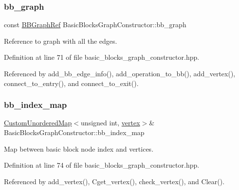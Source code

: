 \subsubsection{\texorpdfstring{bb\+\_\+graph}{bb\_graph}}
{\footnotesize\ttfamily const \hyperlink{basic__block_8hpp_a0e7f233d1b83cad0bfd5aa865f0d3532}{B\+B\+Graph\+Ref} Basic\+Blocks\+Graph\+Constructor\+::bb\+\_\+graph\hspace{0.3cm}{\ttfamily [private]}}



Reference to graph with all the edges. 



Definition at line 71 of file basic\+\_\+blocks\+\_\+graph\+\_\+constructor.\+hpp.



Referenced by add\+\_\+bb\+\_\+edge\+\_\+info(), add\+\_\+operation\+\_\+to\+\_\+bb(), add\+\_\+vertex(), connect\+\_\+to\+\_\+entry(), and connect\+\_\+to\+\_\+exit().

\mbox{\label{classBasicBlocksGraphConstructor_af102a32f04473992c84296a85ed0e86c}} 
\subsubsection{\texorpdfstring{bb\+\_\+index\+\_\+map}{bb\_index\_map}}
{\footnotesize\ttfamily \hyperlink{custom__map_8hpp_ad1ed68f2ff093683ab1a33522b144adc}{Custom\+Unordered\+Map}$<$unsigned int, \hyperlink{graph_8hpp_abefdcf0544e601805af44eca032cca14}{vertex}$>$\& Basic\+Blocks\+Graph\+Constructor\+::bb\+\_\+index\+\_\+map\hspace{0.3cm}{\ttfamily [private]}}



Map between basic block node index and vertices. 



Definition at line 74 of file basic\+\_\+blocks\+\_\+graph\+\_\+constructor.\+hpp.



Referenced by add\+\_\+vertex(), Cget\+\_\+vertex(), check\+\_\+vertex(), and Clear().

\mbox{\label{classBasicBlocksGraphConstructor_a8034e72b335aab8080616019aaa34629}} 
